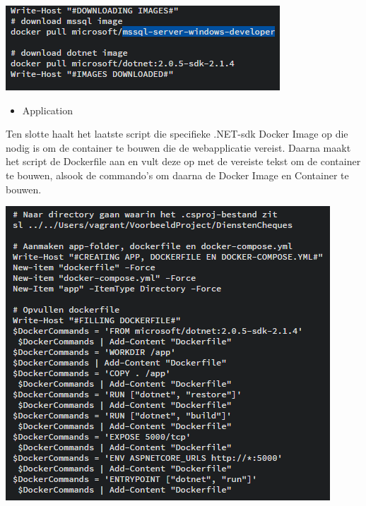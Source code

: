 \begin{center}
	\includegraphics[scale=0.6]{img/dockerimages}
\end{center}

\begin{itemize}[noitemsep]
	\item Application
\end{itemize}

Ten slotte haalt het laatste script die specifieke .NET-sdk Docker Image op die nodig is om de container te bouwen die de webapplicatie vereist. Daarna maakt het script de Dockerfile aan en vult deze op met de vereiste tekst om de container te bouwen, alsook de commando's om daarna de Docker Image en Container te bouwen.

\begin{center}
	\includegraphics[scale=0.6]{img/dockerfile01}
\end{center}

